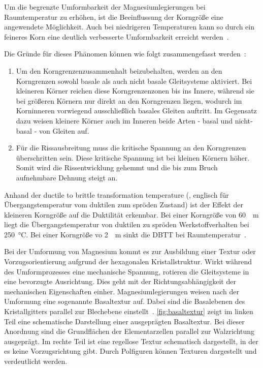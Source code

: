 Um die begrenzte Umformbarkeit der Magnesiumlegierungen bei Raumtemperatur zu erhöhen, ist die Beeinflussung der Korngröße eine angewendete Möglichkeit.
Auch bei niedrigeren Temperaturen kann so durch ein feineres Korn eine deutlich verbesserte Umformbarkeit erreicht werden~\cite{Tripathi2017}.

Die Gründe für dieses Phänomen können wie folgt zusammengefasst werden~\cite{NarayanaMurty2015}:
\begin{enumerate}
    \item Um den Korngrenzenzusammenhalt beizubehalten, werden an den Korngrenzen sowohl basale als auch nicht basale Gleitsysteme aktiviert.
    Bei kleineren Körner reichen diese Korngrenzenzonen bis ins Innere, während sie bei größeren Körnern nur direkt an den Korngrenzen liegen, wodurch im Korninneren vorwiegend ausschließlich basales Gleiten auftritt.
    Im Gegensatz dazu weisen kleinere Körner auch im Inneren beide Arten - basal und nicht-basal - von Gleiten auf.
    \item Für die Rissausbreitung muss die kritische Spannung an den Korngrenzen überschritten sein.
    Diese kritische Spannung ist bei kleinen Körnern höher.
    Somit wird die Rissentwicklung gehemmt und die bis zum Bruch aufnehmbare Dehnung steigt an.
\end{enumerate}

Anhand der ductile to brittle transformation temperature (, englisch für Übergangstemperatur vom duktilen zum spröden Zustand) ist der Effekt der kleineren Korngröße auf die Duktilität erkennbar.
Bei einer Korngröße von \SI{60}{\mu m} liegt die Übergangstemperatur von duktilen zu spröden Werkstoffverhalten bei \SI{250}{\degreeCelsius}.
Bei einer Korngröße vo \SI{2}{\mu m} sinkt die DBTT bei Raumtemperatur~\cite{NarayanaMurty2015}.

Bei der Umformung von Magnesium kommt es zur Ausbildung einer Textur oder Vorzugsorientierung aufgrund der hexagonalen Kristallstruktur.
Wirkt während des Umformprozesses eine mechanische Spannung, rotieren die Gleitsysteme in eine bevorzugte Ausrichtung.
Dies geht mit der Richtungsabhängigkeit der mechanischen Eigenschaften einher.
Magnesiumlegierungen weisen nach der Umformung eine sogenannte Basaltextur auf.
Dabei sind die Basalebenen des Kristallgitters parallel zur Blechebene einstellt~\cite{Styczynski2004,Jeong2007}.
\autoref{fig:basaltextur} zeigt im linken Teil eine schematische Darstellung einer ausgeprägten Basaltextur.
Bei dieser Anordnung sind die Grundflächen der Elementarzellen parallel zur Walzrichtung ausgeprägt.
Im rechte Teil ist eine regellose Textur schematisch dargestellt, in der es keine Vorzugsrichtung gibt.
Durch Polfiguren können Texturen dargestellt und verdeutlicht werden.

